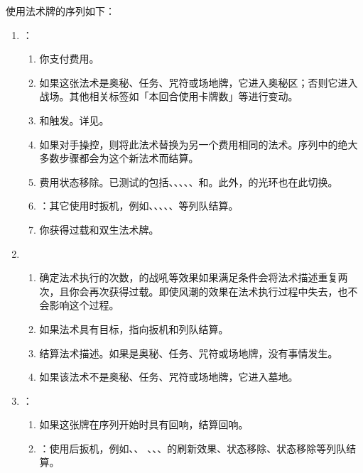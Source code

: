 使用法术牌的序列如下：
\begin{enumerate}
    \item {}：
    \begin{enumerate}
        \item 你支付费用。
        \item 如果这张法术是奥秘、任务、咒符或场地牌，它进入奥秘区；否则它进入战场。其他相关标签如「本回合使用卡牌数」等进行变动。
        \item {}和触发。详见。
        \item 如果对手操控，则将此法术替换为另一个费用相同的法术。序列中的绝大多数步骤都会为这个新法术而结算。
        \item 费用状态移除。已测试的包括、、、、、和。此外，的光环也在此切换。
        \item {}：其它使用时扳机，例如、、、、、等列队结算。
        \item 你获得过载和双生法术牌。
    \end{enumerate}

    \item {}
    \begin{enumerate}
        \item 确定法术执行的次数，的战吼等效果如果满足条件会将法术描述重复两次，且你会再次获得过载。即使风潮的效果在法术执行过程中失去，也不会影响这个过程。
        \item 如果法术具有目标，指向扳机和列队结算。
        \item 结算法术描述。如果是奥秘、任务、咒符或场地牌，没有事情发生。
        \item 如果该法术不是奥秘、任务、咒符或场地牌，它进入墓地。
    \end{enumerate}

    \item {}：
    \begin{enumerate}
        \item 如果这张牌在序列开始时具有回响，结算回响。
        \item {}：使用后扳机，例如、、 、、、的刷新效果、状态移除、状态移除等列队结算。
    \end{enumerate}
\end{enumerate}

